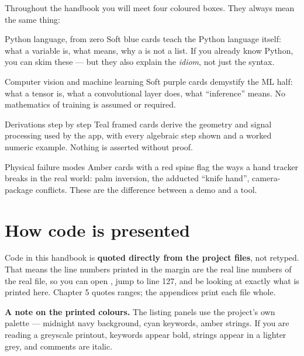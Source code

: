 \documentclass[11pt,a4paper,oneside]{report}
\newcommand{\code}[1]{\texttt{\small\detokenize{#1}}}
\begin{document}
Throughout the handbook you will meet four coloured boxes. They always mean the same thing:

\begin{pythonconcept}{Python language, from zero}
  Soft blue cards teach the Python language itself: what a variable is, what \code{self} means, why
  a \code{deque} is not a list. If you already know Python, you can skim these --- but they also
  explain the \emph{idiom}, not just the syntax.
\end{pythonconcept}

\begin{mlconcept}{Computer vision and machine learning}
  Soft purple cards demystify the ML half: what a tensor is, what a convolutional layer does, what
  ``inference'' means. No mathematics of training is assumed or required.
\end{mlconcept}

\begin{mathdeepdive}{Derivations step by step}
  Teal framed cards derive the geometry and signal processing used by the app, with every algebraic
  step shown and a worked numeric example. Nothing is asserted without proof.
\end{mathdeepdive}

\begin{edgetrap}{Physical failure modes}
  Amber cards with a red spine flag the ways a hand tracker breaks in the real world: palm
  inversion, the adducted ``knife hand'', camera-package conflicts. These are the difference
  between a demo and a tool.
\end{edgetrap}

\section*{How code is presented}

Code in this handbook is \textbf{quoted directly from the project files}, not retyped. That means
the line numbers printed in the margin are the real line numbers of the real file, so you can open
\code{hand_logic.py}, jump to line 127, and be looking at exactly what is printed here. Chapter 5
quotes ranges; the appendices print each file whole.

\begin{keyidea}
\textbf{A note on the printed colours.} The listing panels use the project's own palette --- midnight
navy background, cyan keywords, amber strings. If you are reading a greyscale printout, keywords
appear bold, strings appear in a lighter grey, and comments are italic.
\end{keyidea}

\clearpage

\renewcommand{\contentsname}{Contents}
\tableofcontents

\clearpage







\end{document}
